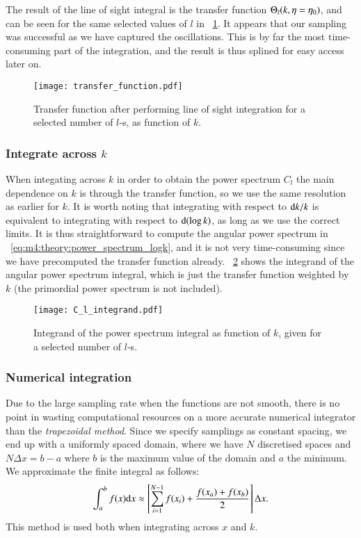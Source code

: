         The result of the line of sight integral is the transfer function $\Theta_l(k, \eta=\eta_0)$, and can be seen for the same selected values of $l$ in ~\cref{fig:m4:transfer_function}. It appears that our sampling was successful as we have captured the oscillations. This is by far the most time-consuming part of the integration, and the result is thus splined for easy access later on. 
        \begin{figure}
            \texttt{[image: transfer\_function.pdf]}
            \caption{Transfer function after performing line of sight integration for a selected number of $l$-s, as function of $k$. }
            \label{fig:m4:transfer_function}
        \end{figure}
    \subsubsection{Integrate across $k$}
        When integating across $k$ in order to obtain the power spectrum $C_l$ the main dependence on $k$ is through the transfer function, so we use the same resolution as earlier for $k$. It is worth noting that integrating with respect to $\mathrm{d} k/k$ is equivalent to integrating with respect to $\mathrm{d}(\log{k})$, as long as we use the correct limits. It is thus straightforward to compute the angular power spectrum in ~\cref{eq:m4:theory:power_spectrum_logk}, and it is not very time-consuming since we have precomputed the transfer function already. ~\cref{fig:m4:C_l_integrand} shows the integrand of the angular power spectrum integral, which is just the transfer function weighted by $k$ (the primordial power spectrum is not included). 
        \begin{figure}
            \texttt{[image: C\_l\_integrand.pdf]}
            \caption{Integrand of the power spectrum integral as function of $k$, given for a selected number of $l$-s.}
            \label{fig:m4:C_l_integrand}
        \end{figure}


    \subsubsection{Numerical integration}
        Due to the large sampling rate when the functions are not smooth, there is no point in wasting computational resources on a more accurate numerical integrator than the \textit{trapezoidal method}. Since we specify samplings as constant spacing, we end up with a uniformly spaced domain, where we have $N$ discretised spaces and $N\Delta x= b-a$ where $b$ is the maximum value of the domain and $a$ the minimum. We approximate the finite integral as follows:
        \begin{equation}
            \int_a^bf(x)\mathrm{d} x \approx \left[ \sum_{i=1}^{N-1}f(x_i) + \frac{f(x_a)+f(x_b)}{2} \right]\Delta x.
        \end{equation}
        This method is used both when integrating across $x$ and $k$. 


